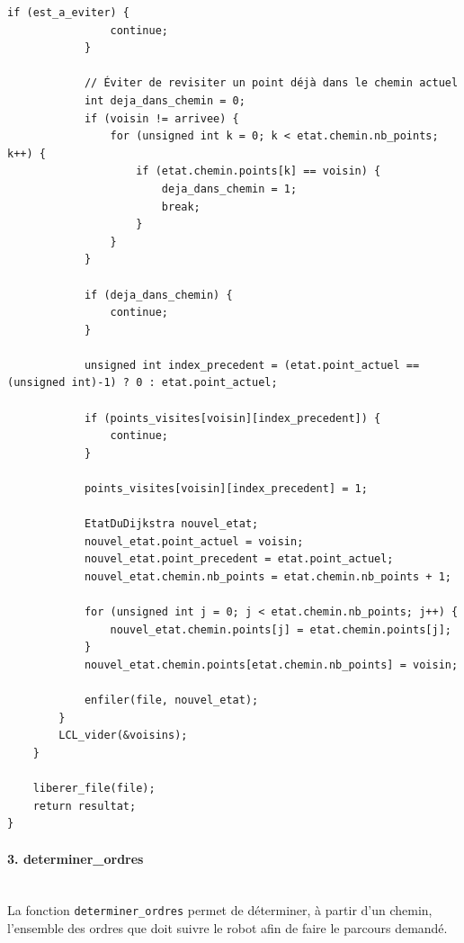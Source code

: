 \documentclass[11pt,a4paper]{article}
\begin{document}
\begin{lstlisting}[caption={Fonction dijkstra avec exclusions}, label=lst:dijkstra]
            if (est_a_eviter) {
                continue;
            }
            
            // Éviter de revisiter un point déjà dans le chemin actuel
            int deja_dans_chemin = 0;
            if (voisin != arrivee) {
                for (unsigned int k = 0; k < etat.chemin.nb_points; k++) {
                    if (etat.chemin.points[k] == voisin) {
                        deja_dans_chemin = 1;
                        break;
                    }
                }
            }
            
            if (deja_dans_chemin) {
                continue;
            }
            
            unsigned int index_precedent = (etat.point_actuel == (unsigned int)-1) ? 0 : etat.point_actuel;
            
            if (points_visites[voisin][index_precedent]) {
                continue;
            }
            
            points_visites[voisin][index_precedent] = 1;
            
            EtatDuDijkstra nouvel_etat;
            nouvel_etat.point_actuel = voisin;
            nouvel_etat.point_precedent = etat.point_actuel;
            nouvel_etat.chemin.nb_points = etat.chemin.nb_points + 1;
            
            for (unsigned int j = 0; j < etat.chemin.nb_points; j++) {
                nouvel_etat.chemin.points[j] = etat.chemin.points[j];
            }
            nouvel_etat.chemin.points[etat.chemin.nb_points] = voisin;
            
            enfiler(file, nouvel_etat);
        }
        LCL_vider(&voisins);
    }
    
    liberer_file(file);
    return resultat;
}
\end{lstlisting}

\paragraph{3. determiner\_ordres} \mbox{} \\[5pt]

La fonction \texttt{determiner\_ordres} permet de déterminer, à partir d'un chemin, l'ensemble des ordres que doit suivre le robot afin de faire le parcours demandé.
\end{document}
